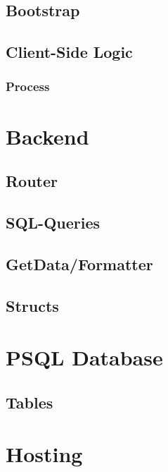 \subsection{Bootstrap} \label{sec:uiframeworks}

\subsection{Client-Side Logic} \label{sec:clientside}

\subsubsection{Process}

\section{Backend}

\subsection{Router}

\subsection{SQL-Queries}

\subsection{GetData/Formatter}

\subsection{Structs}

\section{PSQL Database}

\subsection{Tables}

\section{Hosting}